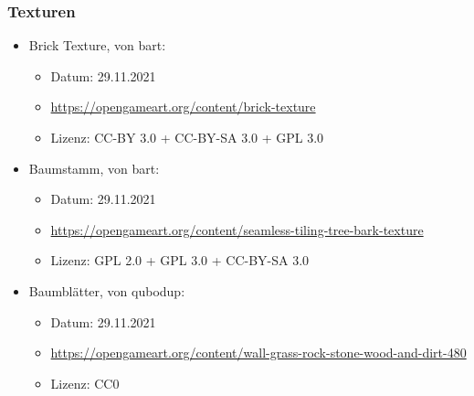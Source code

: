 \documentclass{article}
\begin{document}
\subsubsection*{Texturen}
\begin{itemize}
    \item Brick Texture, von bart:
        \begin{itemize}
            \item Datum: 29.11.2021
            \item \url{https://opengameart.org/content/brick-texture}
            \item Lizenz: CC-BY 3.0 + CC-BY-SA 3.0 + GPL 3.0
        \end{itemize}
    \item Baumstamm, von bart:
        \begin{itemize}
            \item Datum: 29.11.2021
            \item \url{https://opengameart.org/content/seamless-tiling-tree-bark-texture}
            \item Lizenz: GPL 2.0 + GPL 3.0 + CC-BY-SA 3.0
        \end{itemize}
    \item Baumblätter, von qubodup:
        \begin{itemize}
            \item Datum: 29.11.2021
            \item \url{https://opengameart.org/content/wall-grass-rock-stone-wood-and-dirt-480}
            \item Lizenz: CC0
        \end{itemize}
\end{itemize}
\end{document}
